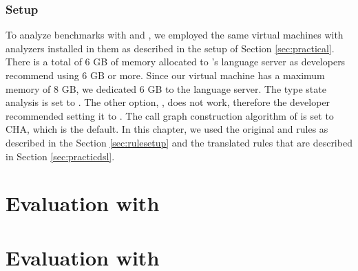 \subsubsection*{Setup}
To analyze benchmarks with \codyze{} and \cognicryptsast, we employed the same virtual machines with analyzers installed in them as described in the setup of Section \ref{sec:practical}. There is a total of 6 GB of memory allocated to \codyze's language server as \codyze{} developers recommend using 6 GB or more. Since our virtual machine has a maximum memory of 8 GB, we dedicated 6 GB to the language server. The type state analysis is set to . The other option, , does not work, therefore the \codyze{} developer recommended setting it to . The call graph construction algorithm of \cognicryptsast{} is set to CHA, which is the default. In this chapter, we used the original \crysl{} and \MARK{} rules as described in the Section \ref{sec:rulesetup} and the translated rules that are described in Section \ref{sec:practicdsl}.


\section{Evaluation with \cryptoapibench}

\label{sec:apibench}

\section{Evaluation with \cognicrypttestgen}

\label{sec:testgen}